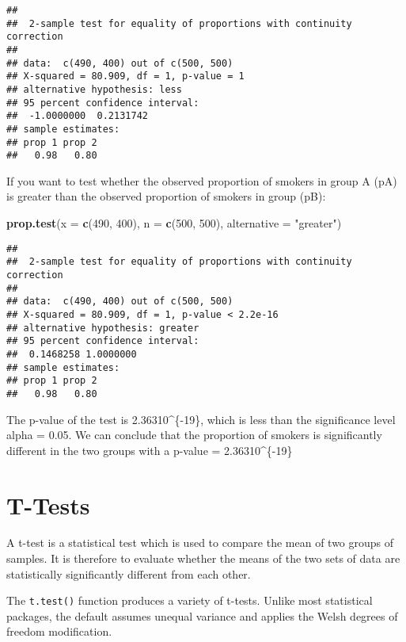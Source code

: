 \documentclass[
]{article}
\newenvironment{Shaded}{\begin{snugshade}}{\end{snugshade}}
\newcommand{\DataTypeTok}[1]{\textcolor[rgb]{0.13,0.29,0.53}{#1}}
\newcommand{\DecValTok}[1]{\textcolor[rgb]{0.00,0.00,0.81}{#1}}
\newcommand{\KeywordTok}[1]{\textcolor[rgb]{0.13,0.29,0.53}{\textbf{#1}}}
\newcommand{\NormalTok}[1]{#1}
\newcommand{\StringTok}[1]{\textcolor[rgb]{0.31,0.60,0.02}{#1}}
\begin{document}
\begin{verbatim}
## 
##  2-sample test for equality of proportions with continuity correction
## 
## data:  c(490, 400) out of c(500, 500)
## X-squared = 80.909, df = 1, p-value = 1
## alternative hypothesis: less
## 95 percent confidence interval:
##  -1.0000000  0.2131742
## sample estimates:
## prop 1 prop 2 
##   0.98   0.80
\end{verbatim}

If you want to test whether the observed proportion of smokers in group
A (pA) is greater than the observed proportion of smokers in group (pB):

\begin{Shaded}
\begin{Highlighting}[]
\KeywordTok{prop.test}\NormalTok{(}\DataTypeTok{x =} \KeywordTok{c}\NormalTok{(}\DecValTok{490}\NormalTok{, }\DecValTok{400}\NormalTok{), }\DataTypeTok{n =} \KeywordTok{c}\NormalTok{(}\DecValTok{500}\NormalTok{, }\DecValTok{500}\NormalTok{),}
              \DataTypeTok{alternative =} \StringTok{"greater"}\NormalTok{)}
\end{Highlighting}
\end{Shaded}

\begin{verbatim}
## 
##  2-sample test for equality of proportions with continuity correction
## 
## data:  c(490, 400) out of c(500, 500)
## X-squared = 80.909, df = 1, p-value < 2.2e-16
## alternative hypothesis: greater
## 95 percent confidence interval:
##  0.1468258 1.0000000
## sample estimates:
## prop 1 prop 2 
##   0.98   0.80
\end{verbatim}

The p-value of the test is 2.36310\^{}\{-19\}, which is less than the
significance level alpha = 0.05. We can conclude that the proportion of
smokers is significantly different in the two groups with a p-value =
2.36310\^{}\{-19\}

\hypertarget{t-tests}{%
\section{T-Tests}\label{t-tests}}

A t-test is a statistical test which is used to compare the mean of two
groups of samples. It is therefore to evaluate whether the means of the
two sets of data are statistically significantly different from each
other.

The \texttt{t.test()} function produces a variety of t-tests. Unlike
most statistical packages, the default assumes unequal variance and
applies the Welsh degrees of freedom modification.
\end{document}
